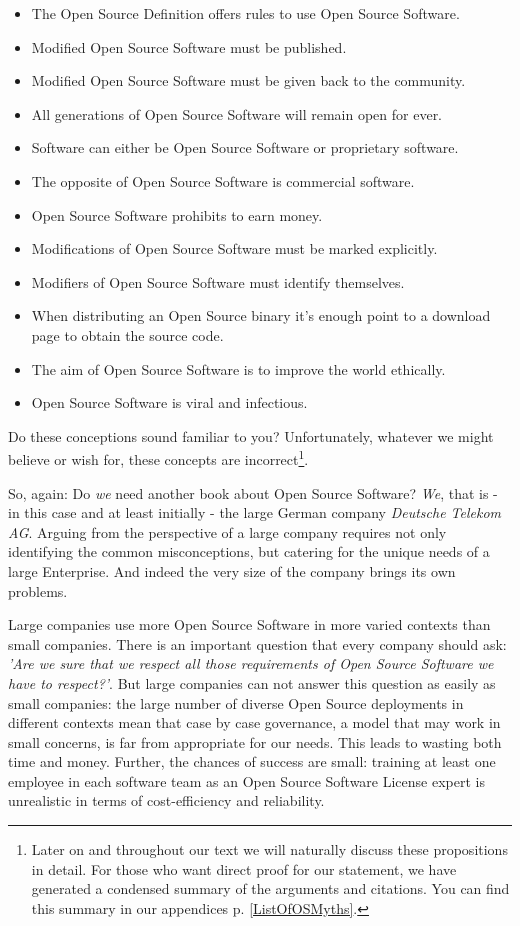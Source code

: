 \begin{itemize}
  \item The Open Source Definition offers rules to use Open Source Software.
  \item Modified Open Source Software must be published.
  \item Modified Open Source Software must be given back to the community.
  \item All generations of Open Source Software will remain open for ever.
  \item Software can either be Open Source Software or proprietary software.
  \item The opposite of Open Source Software is commercial software.
  \item Open Source Software prohibits to earn money.
  \item Modifications of Open Source Software must be marked explicitly.
  \item Modifiers of Open Source Software must identify themselves.
  \item When distributing an Open Source binary it’s enough point to a download
  page to obtain the source code.
  \item The aim of Open Source Software is to improve the world ethically.
  \item Open Source Software is viral and infectious.
\end{itemize}

Do these conceptions sound familiar to you? Unfortunately, whatever we might
believe or wish for, these concepts are incorrect\footnote{Later on and
throughout our text we will naturally discuss these propositions in detail. For
those who want direct proof for our statement, we have generated a condensed
summary of the arguments and citations. You can find this summary in our
appendices p. \ref{ListOfOSMyths}.}.

So, again: Do \emph{we} need another book about Open Source Software? \emph{We},
that is - in this case and at least initially - the large German company
\textit{Deutsche Telekom AG}. Arguing from the perspective of a large company
requires not only identifying the common misconceptions, but catering for the
unique needs of a large Enterprise. And indeed the very size of the company
brings its own problems.

Large companies use more Open Source Software in more varied contexts than small
companies. There is an important question that every company should ask:
\emph{'Are we sure that we respect all those requirements of Open Source
Software we have to respect?'}. But large companies can not answer this question
as easily as small companies: the large number of diverse Open Source
deployments in different contexts mean that case by case governance, a model
that may work in small concerns, is far from appropriate for our needs. This
leads to wasting both time and money. Further, the chances of success are small:
training at least one employee in each software team as an Open Source Software
License expert is unrealistic in terms of cost-efficiency and reliability.

